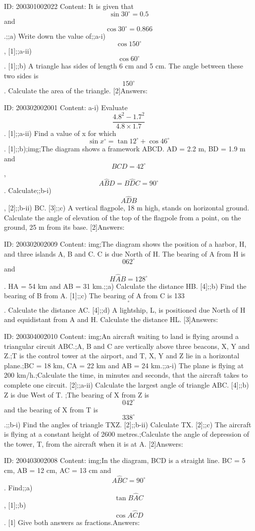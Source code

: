 \documentclass{article}
\begin{document}
ID: 200301002022
Content:
It is given that $$\sin 30^{\circ}=0.5$$ and $$\cos30^{\circ} = 0.866$$.;;a) Write down the value of;;a-i) $$\cos 150^{\circ}$$, [1];;a-ii) $$\cos 60^{\circ}$$. [1];;b) A triangle has sides of length 6 cm and 5 cm. The angle between these two sides is $$150^{\circ}$$. Calculate the area of the triangle. [2]Answers:

ID: 200302002001
Content:
a-i) Evaluate $$\frac{4.8^{2} -1.7^{2}}{4.8 \times 1.7}$$. [1];;a-ii) Find a value of x for which $$\sin x^{\circ}= \tan 12^{\circ}+\cos 46^{\circ}$$. [1];;b);img;The diagram shows a framework ABCD. AD = 2.2 m, BD = 1.9 m and $$BCD=42^{\circ}$$, $$A \hat BD=B \hat DC=90^{\circ}$$. Calculate;;b-i) $$A \hat DB$$, [2];;b-ii) BC. [3];;c) A vertical flagpole, 18 m high, stands on horizontal ground. Calculate the angle of elevation of the top of the flagpole from a point, on the ground, 25 m from its base. [2]Answers:

ID: 200302002009
Content:
img;The diagram shows the position of a harbor, H, and three islands A, B and C. C is due North of H. The bearing of A from H is $$062^{\circ}$$ and $$H \hat AB=128^{\circ}$$. HA = 54 km and AB = 31 km.;;a) Calculate the distance HB. [4];;b) Find the bearing of B from A. [1];;c) The bearing of A from C is 133$$^{\circ}$$. Calculate the distance AC. [4];;d) A lightship, L, is positioned due North of H and equidistant from A and H. Calculate the distance HL. [3]Answers:

ID: 200304002010
Content:
img;An aircraft waiting to land is flying around a triangular circuit ABC.;A, B and C are vertically above three beacons, X, Y and Z.;T is the control tower at the airport, and T, X, Y and Z lie in a horizontal plane.;BC = 18 km, CA = 22 km and AB = 24 km.;;a-i) The plane is flying at 200 km/h.;Calculate the time, in minutes and seconds, that the aircraft takes to complete one circuit.   [2];;a-ii) Calculate the largest angle of triangle ABC.   [4];;b) Z is due West of T. ;The bearing of X from Z is $$042^{\circ}$$ and the bearing of X from T is $$338^{\circ}$$.;;b-i) Find the angles of triangle TXZ.   [2];;b-ii) Calculate TX.   [2];;c) The aircraft is flying at a constant height of 2600 metres.;Calculate the angle of depression of the tower, T, from the aircraft when it is at A.   [2]Answers:

ID: 200403002008
Content:
img;In the diagram, BCD is a straight line. BC = 5 cm, AB = 12 cm, AC = 13 cm and $$A \hat BC=90^{\circ}$$. Find;;a) $$\tan B \hat AC$$, [1];;b) $$\cos A \hat CD$$. [1]  Give both answers as fractions.Answers:
\end{document}
